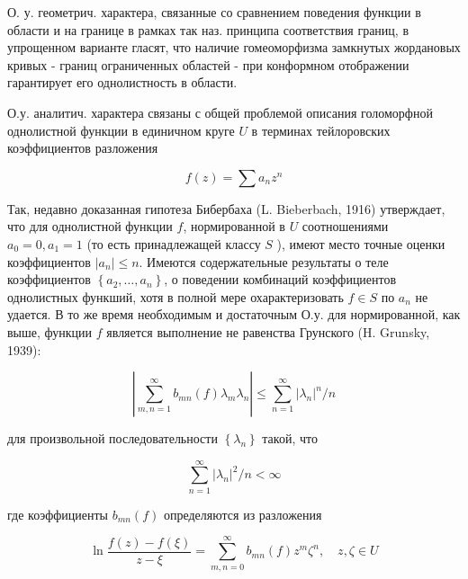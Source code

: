 \documentclass[10pt]{article}
\begin{document}
О. у. геометрич. характера, связанные со сравнением поведения функции в области и на границе в рамках так наз. принципа соответствия границ, в упрощенном варианте гласят, что наличие гомеоморфизма замкнутых жордановых кривых - границ ограниченных областей - при конформном отображении гарантирует его однолистность в области.



О.у. аналитич. характера связаны с общей проблемой описания голоморфной однолистной функции в единичном круге $U$ в терминах тейлоровских коэффициентов разложения



\[

f(z)=\sum a_{n} z^{n}

\]



Так, недавно доказанная гипотеза Бибербаха (L. Bieberbach, 1916) утверждает, что для однолистной функции $f$, нормированной в $U$ соотношениями $a_{0}=0, a_{1}=1$ (то есть принадлежащей классу $S$ ), имеют место точные оценки коэффициентов $\left|a_{n}\right| \leqslant n$. Имеются содержательные результаты о теле коэффициентов $\left\{a_{2}, \ldots, a_{n}\right\}$, о поведении комбинаций коэффициентов однолистных функший, хотя в полной мере охарактеризовать $f \in S$ по $a_{n}$ не удается. В то же время необходимым и достаточным О.у. для нормированной, как выше, функции $f$ является выполнение не равенства Грунского (H. Grunsky, 1939):



\[

\left|\sum_{m, n=1}^{\infty} b_{m n}(f) \lambda_{m} \lambda_{n}\right| \leqslant \sum_{n=1}^{\infty}\left|\lambda_{n}\right|^{n} / n

\]



для произвольной последовательности $\left\{\lambda_{n}\right\}$ такой, что



\[

\sum_{n=1}^{\infty}\left|\lambda_{n}\right|^{2} / n<\infty

\]



где коэффициенты $b_{m n}(f)$ определяются из разложения



\[

\ln \frac{f(z)-f(\xi)}{z-\xi}=\sum_{m, n=0}^{\infty} b_{m n}(f) z^{m} \zeta^{n}, \quad z, \zeta \in U

\]
\end{document}
